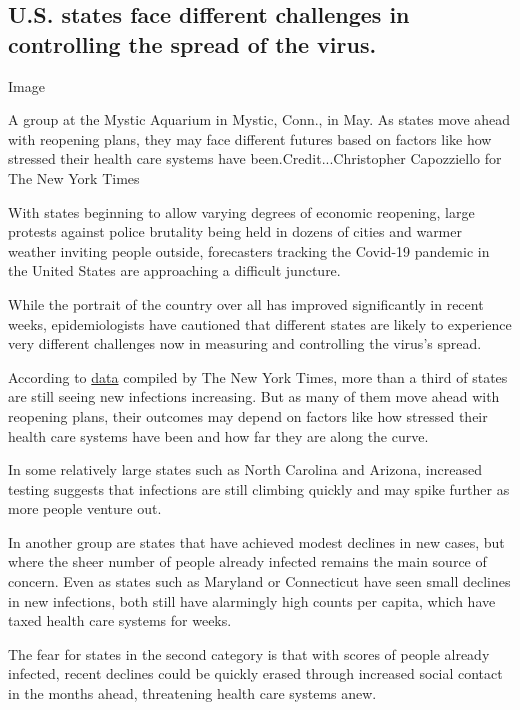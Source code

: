 \hypertarget{us-states-face-different-challenges-in-controlling-the-spread-of-the-virus}{%
\subsection{U.S. states face different challenges in controlling the
spread of the
virus.}\label{us-states-face-different-challenges-in-controlling-the-spread-of-the-virus}}

Image

A group at the Mystic Aquarium in Mystic, Conn., in May. As states move
ahead with reopening plans, they may face different futures based on
factors like how stressed their health care systems have
been.Credit...Christopher Capozziello for The New York Times

With states beginning to allow varying degrees of economic reopening,
large protests against police brutality being held in dozens of cities
and warmer weather inviting people outside, forecasters tracking the
Covid-19 pandemic in the United States are approaching a difficult
juncture.

While the portrait of the country over all has improved significantly in
recent weeks, epidemiologists have cautioned that different states are
likely to experience very different challenges now in measuring and
controlling the virus's spread.

According to
\href{https://www.nytimes3xbfgragh.onion/interactive/2020/us/coronavirus-us-cases.html}{data}
compiled by The New York Times, more than a third of states are still
seeing new infections increasing. But as many of them move ahead with
reopening plans, their outcomes may depend on factors like how stressed
their health care systems have been and how far they are along the
curve.

In some relatively large states such as North Carolina and Arizona,
increased testing suggests that infections are still climbing quickly
and may spike further as more people venture out.

In another group are states that have achieved modest declines in new
cases, but where the sheer number of people already infected remains the
main source of concern. Even as states such as Maryland or Connecticut
have seen small declines in new infections, both still have alarmingly
high counts per capita, which have taxed health care systems for weeks.

The fear for states in the second category is that with scores of people
already infected, recent declines could be quickly erased through
increased social contact in the months ahead, threatening health care
systems anew.

